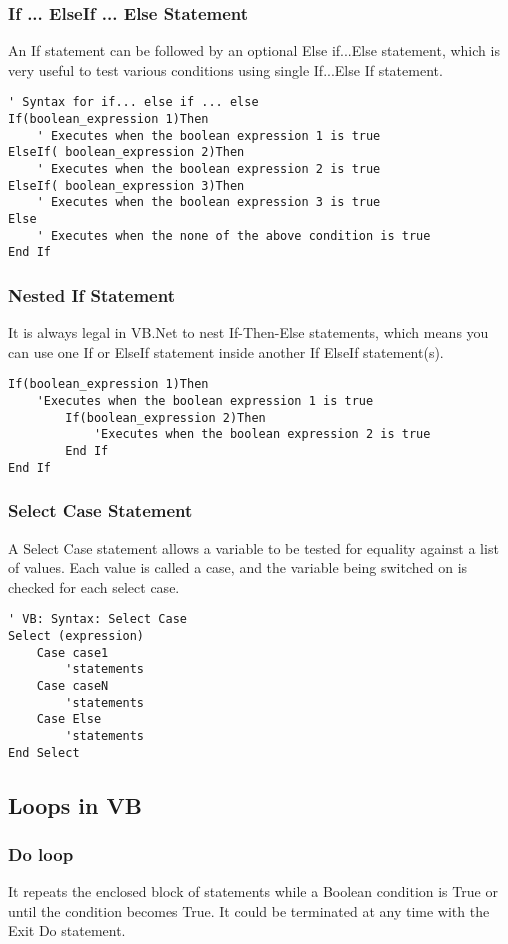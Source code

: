 \subsubsection{If ...  ElseIf ... Else Statement}
An If statement can be followed by an optional Else if...Else statement, which is very useful to test various conditions using single If...Else If statement.
\begin{lstlisting}[style=vb, numbers=none]
' Syntax for if... else if ... else
If(boolean_expression 1)Then
	' Executes when the boolean expression 1 is true
ElseIf( boolean_expression 2)Then
	' Executes when the boolean expression 2 is true
ElseIf( boolean_expression 3)Then
	' Executes when the boolean expression 3 is true
Else
	' Executes when the none of the above condition is true
End If
\end{lstlisting}

\subsubsection{Nested If Statement}
It is always legal in VB.Net to nest If-Then-Else statements, which means you can use one If or ElseIf statement inside another If ElseIf statement(s).

\begin{lstlisting}[style=vb, numbers=none]
If(boolean_expression 1)Then
 	'Executes when the boolean expression 1 is true
		If(boolean_expression 2)Then
			'Executes when the boolean expression 2 is true
		End If
End If
\end{lstlisting}


\subsubsection{Select Case Statement}
A Select Case statement allows a variable to be tested for equality against a list of values. Each value is called a case, and the variable being switched on is checked for each select case.
\begin{lstlisting}[style=vb, numbers=none]
' VB: Syntax: Select Case
Select (expression)
	Case case1
		'statements
	Case caseN
		'statements
	Case Else
		'statements
End Select
\end{lstlisting}

\subsection*{Loops in VB}
\subsubsection*{Do loop}
It repeats the enclosed block of statements while a Boolean condition is True or until the condition becomes True. It could be terminated at any time with the Exit Do statement.

